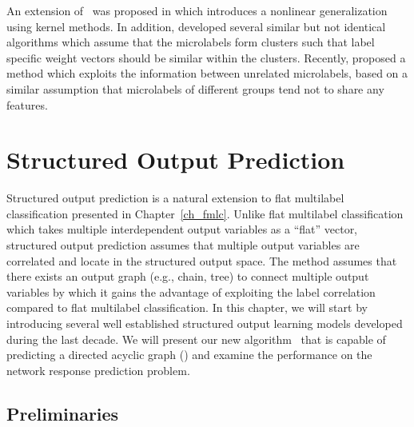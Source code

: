 {An extension of \mtl\ was proposed in \citep{Argyriou08convex} which introduces a nonlinear generalization using kernel methods.
In addition, \citet{Argyriou08an,Jacob09cluster} developed several similar but not identical algorithms which assume that the microlabels form clusters such that label specific weight vectors should be similar within the clusters.
Recently, \citet{Paredes12exploit} proposed a method which exploits the information between unrelated microlabels, based on a similar assumption that microlabels of different groups tend not to share any features.




%
%
\chapter{Structured Output Prediction} \label{ch_sop}

Structured output prediction is a natural extension to flat multilabel classification presented in Chapter~\ref{ch_fmlc}.
Unlike flat multilabel classification which takes multiple interdependent output variables as a ``flat'' vector, structured output prediction assumes that multiple output variables are correlated and locate in the structured output space.
The method assumes that there exists an output graph (e.g., chain, tree) to connect multiple output variables by which it gains the advantage of exploiting the label correlation compared to flat multilabel classification.
In this chapter, we will start by introducing several well established structured output learning models developed during the last decade.
We will present our new algorithm \spin\ that is capable of predicting a directed acyclic graph (\daggraph) and examine the performance on the network response prediction problem.



%
%
\section{Preliminaries}

}
